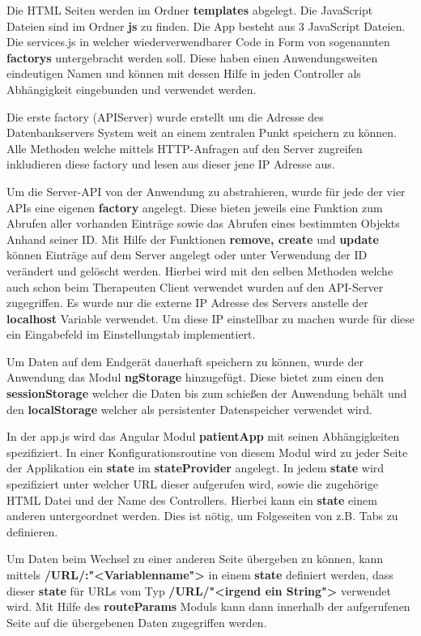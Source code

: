 Die HTML Seiten werden im Ordner \textbf{templates} abgelegt. Die JavaScript Dateien sind im Ordner \textbf{js} zu finden. Die App besteht aus 3 JavaScript Dateien. Die services.js in welcher wiederverwendbarer Code in Form von sogenannten \textbf{factorys} untergebracht werden soll. Diese haben einen Anwendungsweiten eindeutigen Namen und können mit dessen Hilfe in jeden Controller als Abhängigkeit eingebunden und verwendet werden.

Die erste factory (APIServer) wurde erstellt um die Adresse des Datenbankservers System weit an einem zentralen Punkt speichern zu können. Alle Methoden welche mittels HTTP-Anfragen auf den Server zugreifen inkludieren diese factory und lesen aus dieser jene IP Adresse aus.

Um die Server-API von der Anwendung zu abstrahieren, wurde für jede der vier APIs eine eigenen \textbf{factory} angelegt. Diese bieten jeweils eine Funktion zum Abrufen aller vorhanden Einträge sowie das Abrufen eines bestimmten Objekts Anhand seiner ID. Mit Hilfe der Funktionen \textbf{remove, create} und \textbf{update} können Einträge auf dem Server angelegt oder unter Verwendung der ID verändert und gelöscht werden. Hierbei wird mit den selben Methoden welche auch schon beim Therapeuten Client verwendet wurden auf den API-Server zugegriffen. Es wurde nur die externe IP Adresse des Servers anstelle der \textbf{localhost} Variable verwendet. Um diese IP einstellbar zu machen wurde für diese ein Eingabefeld im Einstellungstab implementiert. 

Um Daten auf dem Endgerät dauerhaft speichern zu können, wurde der Anwendung das Modul \textbf{ngStorage} hinzugefügt. Diese bietet zum einen den \textbf{sessionStorage} welcher die Daten bis zum schießen der Anwendung behält und den \textbf{localStorage} welcher als persistenter Datenspeicher verwendet wird.

In der app.js wird das Angular Modul \textbf{patientApp} mit seinen Abhängigkeiten spezifiziert. In einer Konfigurationsroutine von diesem Modul wird zu jeder Seite der Applikation ein \textbf{state} im \textbf{stateProvider} angelegt. In jedem \textbf{state} wird spezifiziert unter welcher URL dieser aufgerufen wird, sowie die zugehörige HTML Datei und der Name des Controllers. Hierbei kann ein \textbf{state} einem anderen untergeordnet werden. Dies ist nötig, um Folgeseiten von z.B. Tabs zu definieren.

Um Daten beim Wechsel zu einer anderen Seite übergeben zu können, kann mittels \textbf{/URL/:"<Variablenname">} in einem \textbf{state} definiert werden, dass dieser \textbf{state} für URLs vom Typ \textbf{/URL/"<irgend ein String">} verwendet wird. Mit Hilfe des \textbf{routeParams} Moduls kann dann innerhalb der aufgerufenen Seite auf die übergebenen Daten zugegriffen werden.


